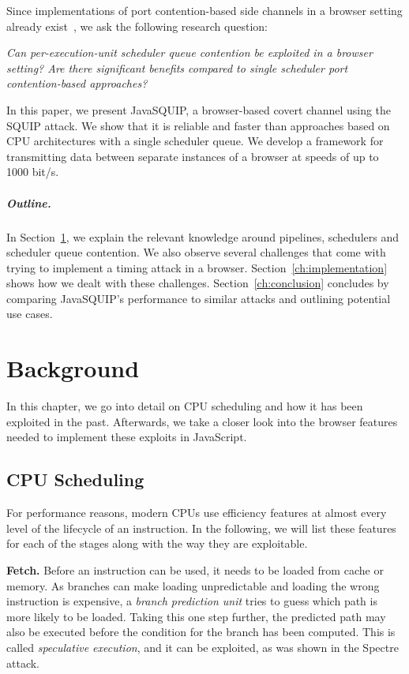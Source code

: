 \documentclass[11pt,
  titlepage=false,
]{scrreprt}
\begin{document}
Since implementations of port contention-based side channels in a browser setting already exist~\cite{Rokicki2022webport}, we ask the following research question:

\textit{Can per-execution-unit scheduler queue contention be exploited in a browser setting? Are there significant benefits compared to single scheduler port contention-based approaches?}

In this paper, we present JavaSQUIP, a browser-based covert channel using the SQUIP attack.
We show that it is reliable and faster than approaches based on CPU architectures with a single scheduler queue.
We develop a framework for transmitting data between separate instances of a browser at speeds of up to 1000 bit/s.

\paragraph{Outline.}
In Section~\ref{ch:background}, we explain the relevant knowledge around pipelines, schedulers and scheduler queue contention.
We also observe several challenges that come with trying to implement a timing attack in a browser.
Section~\ref{ch:implementation} shows how we dealt with these challenges.
Section~\ref{ch:conclusion} concludes by comparing JavaSQUIP's performance to similar attacks and outlining potential use cases.



\chapter{Background}
\label{ch:background}

In this chapter, we go into detail on CPU scheduling and how it has been exploited in the past.
Afterwards, we take a closer look into the browser features needed to implement these exploits in JavaScript.

\section{CPU Scheduling}
\label{sec:cpuschedulers}
For performance reasons, modern CPUs use efficiency features at almost every level of the lifecycle of an instruction.
In the following, we will list these features for each of the stages along with the way they are exploitable.

\textbf{Fetch.}
Before an instruction can be used, it needs to be loaded from cache or memory.
As branches can make loading unpredictable and loading the wrong instruction is expensive, a \textit{branch prediction unit} tries to guess which path is more likely to be loaded.
Taking this one step further, the predicted path may also be executed before the condition for the branch has been computed.
This is called \textit{speculative execution}, and it can be exploited, as was shown in the Spectre~\cite{spKocherHFGGHHLM019} attack.
\end{document}
